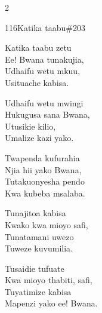 \documentclass{article}
\begin{document}
\begin{multicols}{2}
\begin{hymn}{116}{Katika taabu}{\#203}
\begin{stanza}
Katika taabu zetu\\
Ee! Bwana tunakujia,\\
Udhaifu wetu mkuu,\\
Usituache kabisa.
\end{stanza}
\begin{chorus}
Udhaifu wetu mwingi\\
Hukugusa sana Bwana,\\
Utusikie kilio,\\
Umalize kazi yako.
\end{chorus}
\begin{stanza}
Twapenda kufurahia\\
Njia hii yako Bwana,\\
Tutakuonyesha pendo\\
Kwa kubeba msalaba.
\end{stanza}
\begin{stanza}
Tunajitoa kabisa\\
Kwako kwa mioyo safi,\\
Tunatamani uwezo\\
Tuweze kuvumilia.
\end{stanza}
\begin{stanza}
Tusaidie tufuate\\
Kwa mioyo thabiti, safi,\\
Tuyatimize kabisa\\
Mapenzi yako ee! Bwana.
\end{stanza}
\end{hymn}


\end{multicols}
\end{document}
